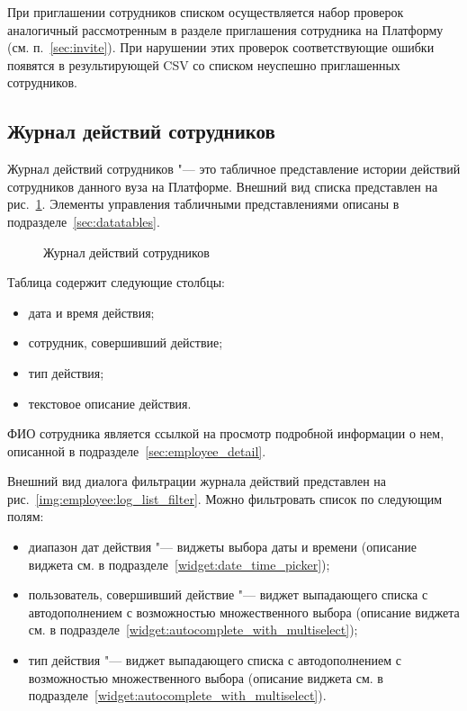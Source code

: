 При приглашении сотрудников списком осуществляется набор проверок аналогичный рассмотренным в разделе 
приглашения сотрудника на Платформу (см. п.~\ref{sec:invite}).
При нарушении этих проверок соответствующие ошибки появятся в результирующей CSV со списком неуспешно 
приглашенных сотрудников.


\subsection{Журнал действий сотрудников}
Журнал действий сотрудников "--- это табличное представление истории действий сотрудников данного вуза на Платформе.
Внешний вид списка представлен на рис.~\ref{img:employee:log_list}. 
Элементы управления табличными представлениями описаны в подразделе~\ref{sec:datatables}.
\begin{figure}[H]
	\caption{Журнал действий сотрудников}
	\label{img:employee:log_list}
\end{figure}

Таблица содержит следующие столбцы:
\begin{itemize}
	\item дата и время действия;
	\item сотрудник, совершивший действие;
	\item тип действия;
	\item текстовое описание действия.
\end{itemize}

ФИО сотрудника является ссылкой на просмотр подробной информации о нем, описанной в подразделе~\ref{sec:employee_detail}.

Внешний вид диалога фильтрации журнала действий представлен на рис.~\ref{img:employee:log_list_filter}.
Можно фильтровать список по следующим полям:

\begin{itemize}
	\item диапазон дат действия "--- виджеты выбора даты и времени 
	(описание виджета см. в подразделе~\ref{widget:date_time_picker});
	\item пользователь, совершивший действие "--- виджет выпадающего списка с автодополнением с возможностью множественного выбора 
	(описание виджета см. в подразделе~\ref{widget:autocomplete_with_multiselect});
	\item тип действия "--- виджет выпадающего списка с автодополнением с возможностью множественного выбора
	(описание виджета см. в подразделе~\ref{widget:autocomplete_with_multiselect}).
\end{itemize}

